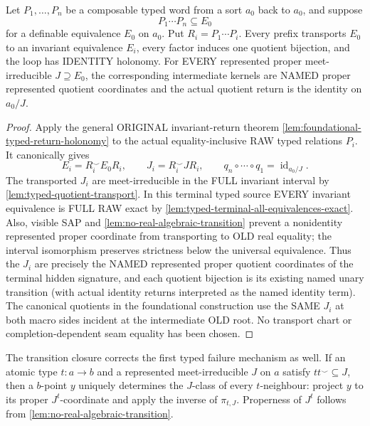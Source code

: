 \begin{lemma}\label{lem:typed-return-transport}
Let \(P_1,\ldots,P_n\) be a composable typed word from a sort \(a_0\)
back to \(a_0\), and suppose
\[
 P_1\cdots P_n\subseteq E_0
\]
for a definable equivalence \(E_0\) on \(a_0\). Put
\(R_i=P_1\cdots P_i\). Every prefix transports \(E_0\)
to an invariant equivalence \(E_i\), every factor induces one
quotient bijection, and the loop has IDENTITY holonomy.
For EVERY represented proper meet-irreducible
\(J\supseteq E_0\), the corresponding intermediate
kernels are NAMED proper represented quotient coordinates
and the actual quotient return is the identity on \(a_0/J\).
\end{lemma}
\begin{proof}
Apply the general ORIGINAL invariant-return theorem
\cref{lem:foundational-typed-return-holonomy}
to the actual equality-inclusive RAW typed relations \(P_i\).
It canonically gives
\[
 E_i=R_i^\smile E_0R_i,\qquad
 J_i=R_i^\smile JR_i,\qquad
 q_n\circ\cdots\circ q_1=\operatorname{id}_{a_0/J}.
\]
The transported \(J_i\) are meet-irreducible in the FULL
invariant interval by
\cref{lem:typed-quotient-transport}.
In this terminal typed source EVERY invariant equivalence is
FULL RAW exact by
\cref{lem:typed-terminal-all-equivalences-exact}.
Also, visible SAP and
\cref{lem:no-real-algebraic-transition}
prevent a nonidentity represented proper coordinate from
transporting to OLD real equality; the interval isomorphism
preserves strictness below the universal equivalence.
Thus the \(J_i\) are precisely the NAMED represented proper
quotient coordinates of the terminal hidden signature,
and each quotient bijection is its existing named unary
transition (with actual identity returns interpreted as
the named identity term). The canonical quotients in the
foundational construction use the SAME \(J_i\) at both
macro sides incident at the intermediate OLD root.
No transport chart or completion-dependent seam equality
has been chosen.
\end{proof}

The transition closure corrects the first typed failure mechanism as well.
If an atomic type \(t:a\to b\) and a represented meet-irreducible \(J\) on
\(a\) satisfy \(tt^{\smile}\subseteq J\), then a \(b\)-point \(y\)
uniquely determines the \(J\)-class of every \(t\)-neighbour: project \(y\)
to its proper \(J^t\)-coordinate and apply the inverse of \(\pi_{t,J}\).
Properness of \(J^t\) follows from
\cref{lem:no-real-algebraic-transition}.

